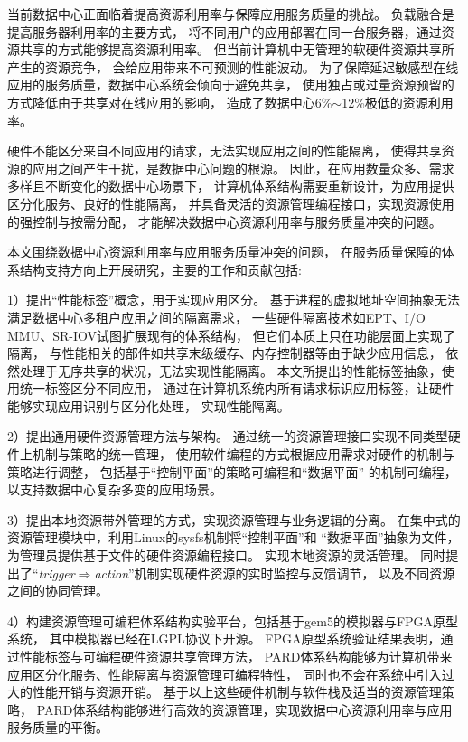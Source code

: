\begin{cabstract}
  当前数据中心正面临着提高资源利用率与保障应用服务质量的挑战。
  负载融合是提高服务器利用率的主要方式，
  将不同用户的应用部署在同一台服务器，通过资源共享的方式能够提高资源利用率。
  但当前计算机中无管理的软硬件资源共享所产生的资源竞争，
  会给应用带来不可预测的性能波动。
  为了保障延迟敏感型在线应用的服务质量，数据中心系统会倾向于避免共享，
  使用独占或过量资源预留的方式降低由于共享对在线应用的影响，
  造成了数据中心6\%$\sim$12\%极低的资源利用率。

  硬件不能区分来自不同应用的请求，无法实现应用之间的性能隔离，
  使得共享资源的应用之间产生干扰，是数据中心问题的根源。
  因此，在应用数量众多、需求多样且不断变化的数据中心场景下，
  计算机体系结构需要重新设计，为应用提供区分化服务、良好的性能隔离，
  并具备灵活的资源管理编程接口，实现资源使用的强控制与按需分配，
  才能解决数据中心资源利用率与服务质量冲突的问题。

  本文围绕数据中心资源利用率与应用服务质量冲突的问题，
  在服务质量保障的体系结构支持方向上开展研究，主要的工作和贡献包括:

  1）提出``性能标签''概念，用于实现应用区分。
     基于进程的虚拟地址空间抽象无法满足数据中心多租户应用之间的隔离需求，
     一些硬件隔离技术如EPT、I/O MMU、SR-IOV试图扩展现有的体系结构，
     但它们本质上只在功能层面上实现了隔离，
     与性能相关的部件如共享末级缓存、内存控制器等由于缺少应用信息，
     依然处理于无序共享的状况，无法实现性能隔离。
     本文所提出的性能标签抽象，使用统一标签区分不同应用，
     通过在计算机系统内所有请求标识应用标签，让硬件能够实现应用识别与区分化处理，
     实现性能隔离。

  2）提出通用硬件资源管理方法与架构。
     通过统一的资源管理接口实现不同类型硬件上机制与策略的统一管理，
     使用软件编程的方式根据应用需求对硬件的机制与策略进行调整，
     包括基于``控制平面''的策略可编程和``数据平面'' 的机制可编程，
     以支持数据中心复杂多变的应用场景。

  3）提出本地资源带外管理的方式，实现资源管理与业务逻辑的分离。
     在集中式的资源管理模块中，利用Linux的sysfs机制将``控制平面''和
     ``数据平面''抽象为文件，为管理员提供基于文件的硬件资源编程接口。
     实现本地资源的灵活管理。
     同时提出了``\emph{trigger$\Rightarrow$action}''机制实现硬件资源的实时监控与反馈调节，
     以及不同资源之间的协同管理。

  4）构建资源管理可编程体系结构实验平台，包括基于gem5的模拟器与FPGA原型系统，
     其中模拟器已经在LGPL协议下开源。
     FPGA原型系统验证结果表明，通过性能标签与可编程硬件资源共享管理方法，
     PARD体系结构能够为计算机带来应用区分化服务、性能隔离与资源管理可编程特性，
     同时也不会在系统中引入过大的性能开销与资源开销。
     基于以上这些硬件机制与软件栈及适当的资源管理策略，
     PARD体系结构能够进行高效的资源管理，实现数据中心资源利用率与应用服务质量的平衡。
\end{cabstract}

